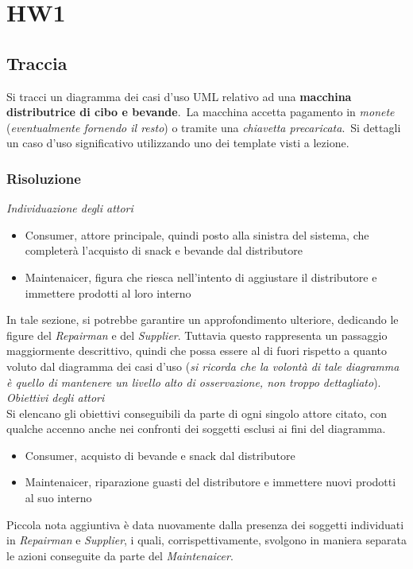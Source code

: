\documentclass{article}
\begin{document}
\pagestyle{empty}

\section*{HW1}
\large

\subsection*{Traccia}
\large
Si tracci un diagramma dei casi d’uso UML relativo ad una \textbf{macchina distributrice di cibo e bevande}.\ La macchina accetta pagamento in \textit{monete} (\textit{eventualmente fornendo il resto}) o tramite una \textit{chiavetta precaricata}.\ Si dettagli un caso d’uso significativo utilizzando uno dei template visti a lezione.

\subsubsection*{Risoluzione}
\large
\textit{Individuazione degli attori}
\begin{itemize}[label={-}]
    \item Consumer, attore principale, quindi posto alla sinistra del sistema, che completerà l'acquisto di snack e bevande dal distributore
    \item Maintenaicer, figura che riesca nell'intento di aggiustare il distributore e immettere prodotti al loro interno
\end{itemize}
In tale sezione, si potrebbe garantire un approfondimento ulteriore, dedicando le figure del \textit{Repairman} e del \textit{Supplier}. Tuttavia questo rappresenta un passaggio maggiormente descrittivo, quindi che possa essere al di fuori rispetto a quanto voluto dal diagramma dei casi d'uso (\textit{si ricorda che la volontà di tale diagramma è quello di mantenere un livello alto di osservazione, non troppo dettagliato}).\vspace{14pt}\\
\textit{Obiettivi degli attori}\\
Si elencano gli obiettivi conseguibili da parte di ogni singolo attore citato, con qualche accenno anche nei confronti dei soggetti esclusi ai fini del diagramma.
\begin{itemize}[label={-}]
    \item Consumer, acquisto di bevande e snack dal distributore
    \item Maintenaicer, riparazione guasti del distributore e immettere nuovi prodotti al suo interno
\end{itemize}
Piccola nota aggiuntiva è data nuovamente dalla presenza dei soggetti individuati in \textit{Repairman} e \textit{Supplier}, i quali, corrispettivamente, svolgono in maniera separata le azioni conseguite da parte del \textit{Maintenaicer}.
\end{document}
